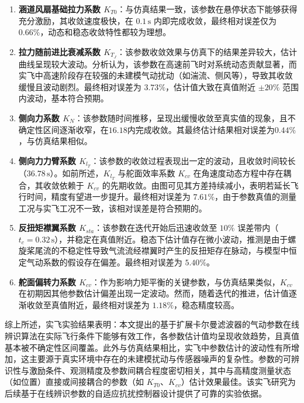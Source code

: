 \begin{enumerate}
\item \textbf{涵道风扇基础拉力系数 \(K_{T0}\)}：与仿真结果一致，该参数在悬停状态下能够获得充分激励，其收敛速度极快，在 \(0.1\,\mathrm{s}\) 内即完成收敛，最终相对误差仅为 \(0.66\%\)，动态和稳态收敛特性都较为理想。
    
\item \textbf{拉力随前进比衰减系数 \(K_{T_J}\)}：该参数收敛效果与仿真下的结果差异较大，估计曲线呈现较大波动。分析认为，该参数在高速前飞时对系统动态贡献显著，而实飞中高速阶段存在较强的未建模气动扰动（如湍流、侧风等），导致其收敛缓慢且波动剧烈。最终相对误差为 \(3.73\%\)，估计值大致在真值附近 \(\pm20\%\) 范围内波动，基本符合预期。

\item \textbf{侧向力系数 \(K_{N}\)}：该参数随时间推移，呈现出缓慢收敛至真实值的现象，且不确定性区间逐渐收窄，在$16.18$内完成收敛。其最终估计结果相对误差为$0.44\%$，与仿真结果相似。

\item \textbf{侧向力力臂系数 \(K_{l_T}\)}：该参数的收敛过程表现出一定的波动，且收敛时间较长（\(36.78\,\mathrm{s}\)）。如前所述，\(K_{l_T}\) 与舵面效率系数 \(K_{cv}\) 在角速度动态方程中存在耦合，其收敛依赖于 \(K_{cv}\) 的先期收敛。由图可见其方差持续减小，表明若延长飞行时间，精度有望进一步提升。最终相对误差为 \(7.61\%\)，由于参数真值的测量工况与实飞工况不一致，该相对误差是符合预期的。

\item \textbf{反扭矩襟翼系数 \(K_{sta}\)}：该参数在迭代开始后迅速收敛至 \(10\%\) 误差带内（\(t_c = 0.32\,\mathrm{s}\)），并稳定在真值附近。稳态下估计值存在微小波动，推测是由于螺旋桨尾流的不稳定性导致气流流经襟翼时产生的反扭矩存在脉动，与模型中恒定气动系数的假设存在偏差。最终相对误差为 \(5.40\%\)。

\item \textbf{舵面偏转力系数 \(K_{cv}\)}：作为影响力矩平衡的关键参数，与仿真结果类似，\(K_{cv}\) 在初期因其他参数估计偏差出现一定波动。然而，随着迭代的推进，估计值逐渐收敛至真值附近，最终相对误差为 \(1.18\%\)，稳态精度较高。
\end{enumerate}

综上所述，实飞实验结果表明：本文提出的基于扩展卡尔曼滤波器的气动参数在线辨识算法在实际飞行条件下能够有效工作，各参数估计值均呈现收敛趋势，且真值基本被不确定性区间覆盖。此外与仿真结果相比，实飞中参数估计的波动性有所增加，这主要源于真实环境中存在的未建模扰动与传感器噪声的复杂性。参数的可辨识性与激励条件、观测精度及参数间耦合程度密切相关，其中与高精度测量状态（如位置）直接或间接耦合的参数（如 \(K_{T0}\)、\(K_{cv}\)）估计效果最佳。该实飞研究为后续基于在线辨识参数的自适应抗扰控制器设计提供了可靠的实验依据。

